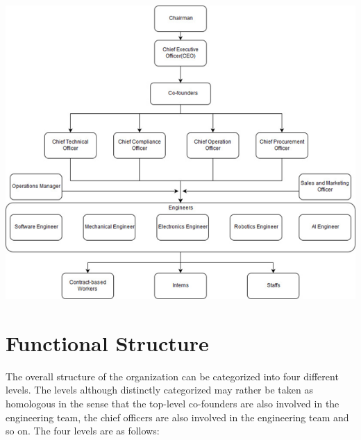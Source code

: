 \documentclass[12pt,a4paper]{scrreprt}
\begin{document}
    \begin{center}
        \includegraphics[scale=0.7]{block-diagram.png}
    \end{center}

\section{Functional Structure}
    The overall structure of the organization can be categorized into four different levels. The levels although distinctly categorized may rather be taken as homologous in the sense that the top-level co-founders are also involved in the engineering team, the chief officers are also involved in the engineering team and so on. The four levels are as follows:
\end{document}
